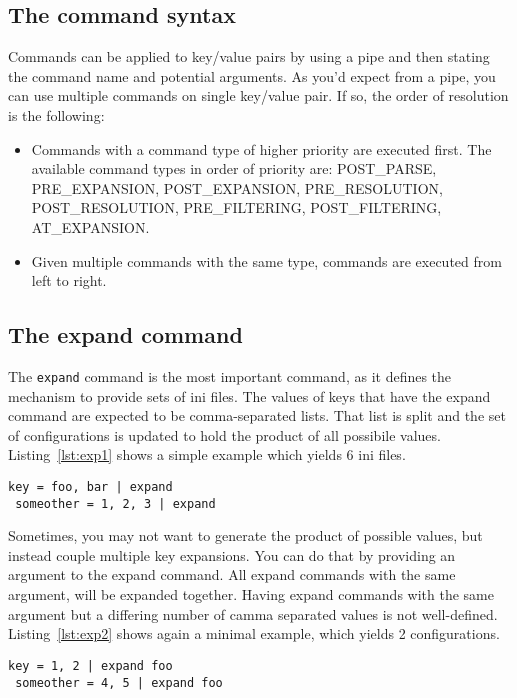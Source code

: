 \documentclass[11pt]{article}
\begin{document}
\subsection{The command syntax}

Commands can be applied to key/value pairs by using a pipe and then stating the command name and potential arguments. As you'd expect from a pipe, you can use multiple commands on single key/value pair. If so, the order of resolution is the following:
\begin{itemize}
 \item Commands with a command type of higher priority are executed first. The available command types in order of priority are: POST\_PARSE, PRE\_EXPANSION, POST\_EXPANSION, PRE\_RESOLUTION, POST\_RESOLUTION, PRE\_FILTERING, POST\_FILTERING, AT\_EXPANSION.
 \item Given multiple commands with the same type, commands are executed from left to right.
\end{itemize}

\subsection{The expand command}

The \lstinline!expand! command is the most important command, as it defines the mechanism to provide sets of ini files. The values of keys that have the expand command are expected to be comma-separated lists. That list is split and the set of configurations is updated to hold the product of all possibile values. Listing~\ref{lst:exp1} shows a simple example which yields 6 ini files.

\begin{lstlisting}[caption={A simple example of expanded keys},label=lst:exp1]
 key = foo, bar | expand
 someother = 1, 2, 3 | expand
\end{lstlisting}

Sometimes, you may not want to generate the product of possible values, but instead couple multiple key expansions. You can do that by providing an argument to the expand command. All expand commands with the same argument, will be expanded together. Having expand commands with the same argument but a differing number of camma separated values is not well-defined. Listing~\ref{lst:exp2} shows again a minimal example, which yields 2 configurations.

\begin{lstlisting}[caption={A simple example of expanded keys with argument},label=lst:exp2]
 key = 1, 2 | expand foo
 someother = 4, 5 | expand foo
\end{lstlisting}
\end{document}
